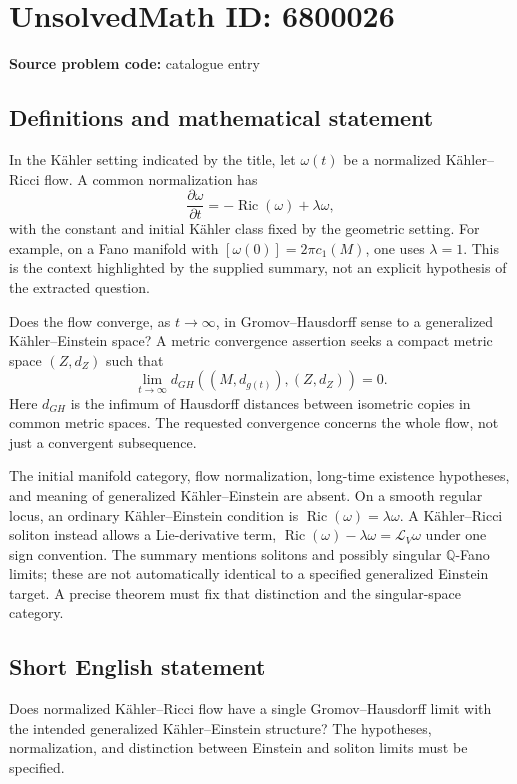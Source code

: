 \documentclass[11pt]{article}
\begin{document}
\section*{UnsolvedMath ID: 6800026}
\textbf{Source problem code:} catalogue entry
\subsection{Definitions and mathematical statement}
In the K\"ahler setting indicated by the title, let $\omega(t)$ be a normalized K\"ahler--Ricci flow. A common normalization has
\[
\frac{\partial\omega}{\partial t}=-\operatorname{Ric}(\omega)+\lambda\omega,
\]
with the constant and initial K\"ahler class fixed by the geometric setting. For example, on a Fano manifold with $[\omega(0)]=2\pi c_1(M)$, one uses $\lambda=1$. This is the context highlighted by the supplied summary, not an explicit hypothesis of the extracted question.

Does the flow converge, as $t\to\infty$, in Gromov--Hausdorff sense to a generalized K\"ahler--Einstein space? A metric convergence assertion seeks a compact metric space $(Z,d_Z)$ such that
\[
\lim_{t\to\infty}d_{GH}((M,d_{g(t)}),(Z,d_Z))=0.
\]
Here $d_{GH}$ is the infimum of Hausdorff distances between isometric copies in common metric spaces. The requested convergence concerns the whole flow, not just a convergent subsequence.

The initial manifold category, flow normalization, long-time existence hypotheses, and meaning of generalized K\"ahler--Einstein are absent. On a smooth regular locus, an ordinary K\"ahler--Einstein condition is $\operatorname{Ric}(\omega)=\lambda\omega$. A K\"ahler--Ricci soliton instead allows a Lie-derivative term, $\operatorname{Ric}(\omega)-\lambda\omega=\mathcal L_V\omega$ under one sign convention. The summary mentions solitons and possibly singular $\mathbb Q$-Fano limits; these are not automatically identical to a specified generalized Einstein target. A precise theorem must fix that distinction and the singular-space category.
\subsection{Short English statement}
Does normalized K\"ahler--Ricci flow have a single Gromov--Hausdorff limit with the intended generalized K\"ahler--Einstein structure? The hypotheses, normalization, and distinction between Einstein and soliton limits must be specified.
\end{document}
